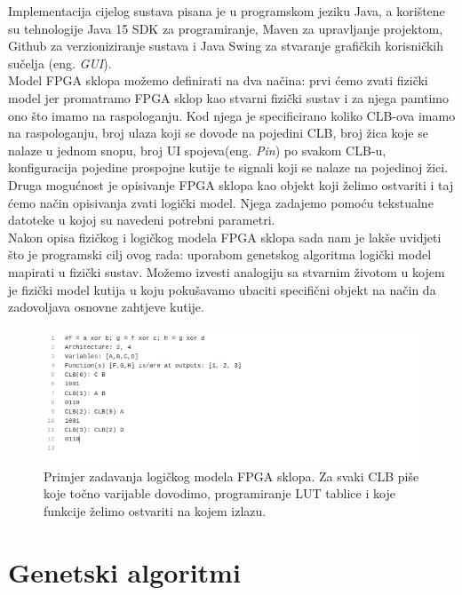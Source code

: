 \documentclass[times, utf8, zavrsni]{fer}
\begin{document}
	Implementacija cijelog sustava pisana je u programskom jeziku Java, a korištene su tehnologije Java 15 SDK za programiranje, Maven za upravljanje projektom, Github za verzioniziranje sustava i Java Swing za stvaranje grafičkih korisničkih sučelja (eng. \emph{GUI}).\\ Model FPGA sklopa možemo definirati na dva načina: prvi ćemo zvati fizički model jer promatramo FPGA sklop kao stvarni fizički sustav i za njega pamtimo ono što imamo na raspologanju. Kod njega je specificirano koliko CLB-ova imamo na raspologanju, broj ulaza koji se dovode na pojedini CLB, broj žica koje se nalaze u jednom snopu, broj UI spojeva(eng. \emph{Pin}) po svakom CLB-u, konfiguracija pojedine prospojne kutije te signali koji se nalaze na pojedinoj žici.\\Druga mogućnost je opisivanje FPGA sklopa kao objekt koji želimo ostvariti i taj ćemo način opisivanja zvati logički model. Njega zadajemo pomoću tekstualne datoteke u kojoj su navedeni potrebni parametri.\\Nakon opisa fizičkog i logičkog modela FPGA sklopa sada nam je lakše uvidjeti što je programski cilj ovog rada: uporabom genetskog algoritma logički model mapirati u fizički sustav. Možemo izvesti analogiju sa stvarnim životom u kojem je fizički model kutija u koju pokušavamo ubaciti specifični objekt na način da zadovoljava osnovne zahtjeve kutije.
	
	
	\begin{figure}[H]
		\centering
		\includegraphics[width=15cm]{slike/logicalModelTxt.png}
		\caption{Primjer zadavanja logičkog modela FPGA sklopa. Za svaki CLB piše koje točno varijable dovodimo, programiranje LUT tablice i koje funkcije želimo ostvariti na kojem izlazu. }
		\label{fig:fpga-logical-model}
	\end{figure}
	
	
	\chapter{Genetski algoritmi}
	
\end{document}
